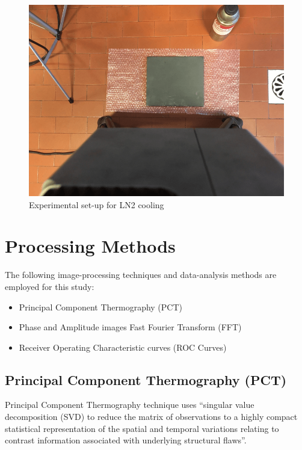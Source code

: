 \documentclass[]{spie}  %
\begin{document}
\begin{figure}[ht]
   \centering
   \includegraphics[scale=0.3]{graph/LN2_setup.png}
   \caption{Experimental set-up for LN2 cooling}
   \label{Exp_LN2}
\end{figure}




\section{Processing Methods} %
\label{sec:processing_methods}
The following image-processing techniques and data-analysis methods are employed for this study:
\begin{itemize}
   \item Principal Component Thermography (PCT)
   \item Phase and Amplitude images Fast Fourier Transform (FFT)
   \item Receiver Operating Characteristic curves (ROC Curves)
\end{itemize}

\subsection{Principal Component Thermography (PCT)}
Principal Component Thermography technique\cite{Rajic2002} uses “singular value decomposition (SVD) to reduce the matrix of observations to a highly compact statistical representation of the spatial and temporal variations relating to contrast information associated with underlying structural flaws”.
\end{document}
